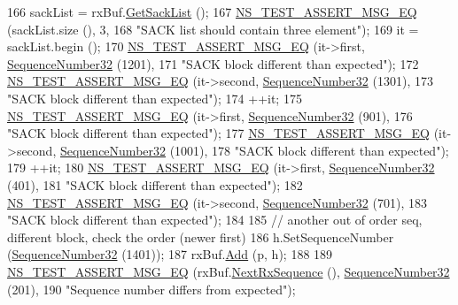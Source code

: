 \begin{DoxyCode}
166   sackList = rxBuf.\hyperlink{classns3_1_1TcpRxBuffer_afc5d672da4595330754de1bb3933a9c7}{GetSackList} ();
167   \hyperlink{group__testing_ga2a9d78cffb3db8e867c35fff0b698cf5}{NS\_TEST\_ASSERT\_MSG\_EQ} (sackList.size (), 3,
168                          \textcolor{stringliteral}{"SACK list should contain three element"});
169   it = sackList.begin ();
170   \hyperlink{group__testing_ga2a9d78cffb3db8e867c35fff0b698cf5}{NS\_TEST\_ASSERT\_MSG\_EQ} (it->first, \hyperlink{classns3_1_1SequenceNumber}{SequenceNumber32} (1201),
171                          \textcolor{stringliteral}{"SACK block different than expected"});
172   \hyperlink{group__testing_ga2a9d78cffb3db8e867c35fff0b698cf5}{NS\_TEST\_ASSERT\_MSG\_EQ} (it->second, \hyperlink{classns3_1_1SequenceNumber}{SequenceNumber32} (1301),
173                          \textcolor{stringliteral}{"SACK block different than expected"});
174   ++it;
175   \hyperlink{group__testing_ga2a9d78cffb3db8e867c35fff0b698cf5}{NS\_TEST\_ASSERT\_MSG\_EQ} (it->first, \hyperlink{classns3_1_1SequenceNumber}{SequenceNumber32} (901),
176                          \textcolor{stringliteral}{"SACK block different than expected"});
177   \hyperlink{group__testing_ga2a9d78cffb3db8e867c35fff0b698cf5}{NS\_TEST\_ASSERT\_MSG\_EQ} (it->second, \hyperlink{classns3_1_1SequenceNumber}{SequenceNumber32} (1001),
178                          \textcolor{stringliteral}{"SACK block different than expected"});
179   ++it;
180   \hyperlink{group__testing_ga2a9d78cffb3db8e867c35fff0b698cf5}{NS\_TEST\_ASSERT\_MSG\_EQ} (it->first, \hyperlink{classns3_1_1SequenceNumber}{SequenceNumber32} (401),
181                          \textcolor{stringliteral}{"SACK block different than expected"});
182   \hyperlink{group__testing_ga2a9d78cffb3db8e867c35fff0b698cf5}{NS\_TEST\_ASSERT\_MSG\_EQ} (it->second, \hyperlink{classns3_1_1SequenceNumber}{SequenceNumber32} (701),
183                          \textcolor{stringliteral}{"SACK block different than expected"});
184 
185   \textcolor{comment}{// another out of order seq, different block, check the order (newer first)}
186   h.SetSequenceNumber (\hyperlink{classns3_1_1SequenceNumber}{SequenceNumber32} (1401));
187   rxBuf.\hyperlink{classns3_1_1TcpRxBuffer_a35a036383b8976cb79738c28aa01d5d0}{Add} (p, h);
188 
189   \hyperlink{group__testing_ga2a9d78cffb3db8e867c35fff0b698cf5}{NS\_TEST\_ASSERT\_MSG\_EQ} (rxBuf.\hyperlink{classns3_1_1TcpRxBuffer_ae994bf90329d10f17b59d32907b04ca9}{NextRxSequence} (), 
      \hyperlink{group__network_gacb2070e4e98d2d5135c9bede58f07a03}{SequenceNumber32} (201),
190                          \textcolor{stringliteral}{"Sequence number differs from expected"});

\end{DoxyCode}
